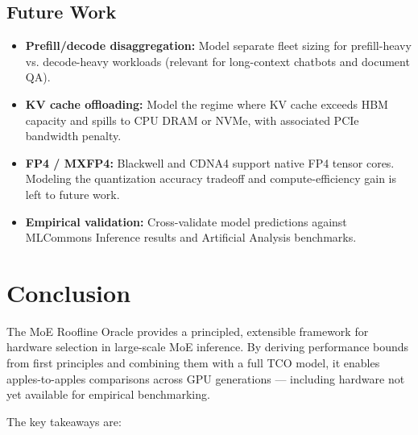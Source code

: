 \documentclass[11pt, letterpaper]{article}
\begin{document}
\subsection{Future Work}

\begin{itemize}[noitemsep]
  \item \textbf{Prefill/decode disaggregation:} Model separate fleet sizing for
    prefill-heavy vs. decode-heavy workloads (relevant for long-context chatbots
    and document QA).
  \item \textbf{KV cache offloading:} Model the regime where KV cache exceeds
    HBM capacity and spills to CPU DRAM or NVMe, with associated PCIe
    bandwidth penalty.
  \item \textbf{FP4 / MXFP4:} Blackwell and CDNA4 support native FP4 tensor
    cores. Modeling the quantization accuracy tradeoff and compute-efficiency
    gain is left to future work.
  \item \textbf{Empirical validation:} Cross-validate model predictions against
    MLCommons Inference results and Artificial Analysis benchmarks.
\end{itemize}

\section{Conclusion}

The MoE Roofline Oracle provides a principled, extensible framework for
hardware selection in large-scale MoE inference. By deriving performance
bounds from first principles and combining them with a full TCO model, it
enables apples-to-apples comparisons across GPU generations --- including
hardware not yet available for empirical benchmarking.

The key takeaways are:
\end{document}
